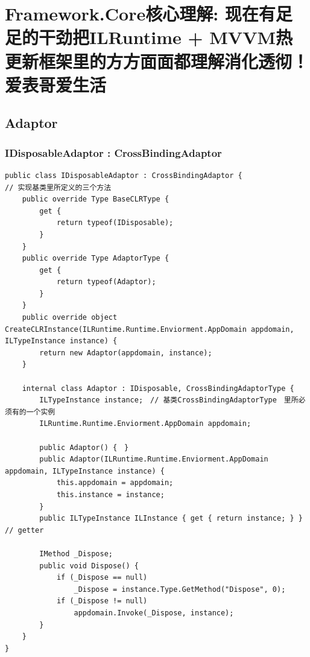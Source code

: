 \documentclass[9pt, b5paper]{article}
\begin{document}
\section{Framework.Core核心理解: 现在有足足的干劲把ILRuntime + MVVM热更新框架里的方方面面都理解消化透彻！爱表哥爱生活}
\label{sec-5}
\subsection{Adaptor}
\label{sec-5-1}
\subsubsection{IDisposableAdaptor : CrossBindingAdaptor}
\label{sec-5-1-1}
\begin{verbatim}
public class IDisposableAdaptor : CrossBindingAdaptor {
// 实现基类里所定义的三个方法    
    public override Type BaseCLRType {
        get {
            return typeof(IDisposable);
        }
    }
    public override Type AdaptorType {
        get {
            return typeof(Adaptor);
        }
    }
    public override object CreateCLRInstance(ILRuntime.Runtime.Enviorment.AppDomain appdomain, ILTypeInstance instance) {
        return new Adaptor(appdomain, instance);
    }

    internal class Adaptor : IDisposable, CrossBindingAdaptorType {
        ILTypeInstance instance;　// 基类CrossBindingAdaptorType　里所必须有的一个实例
        ILRuntime.Runtime.Enviorment.AppDomain appdomain;

        public Adaptor() {　}
        public Adaptor(ILRuntime.Runtime.Enviorment.AppDomain appdomain, ILTypeInstance instance) {
            this.appdomain = appdomain;
            this.instance = instance;
        }
        public ILTypeInstance ILInstance { get { return instance; } } // getter

        IMethod _Dispose;
        public void Dispose() {
            if (_Dispose == null) 
                _Dispose = instance.Type.GetMethod("Dispose", 0);
            if (_Dispose != null)
                appdomain.Invoke(_Dispose, instance);
        }
    }
}
\end{verbatim}
\end{document}
